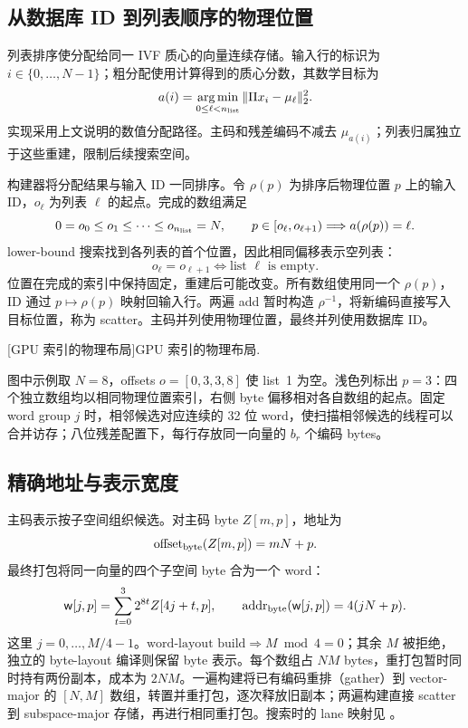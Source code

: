 \subsection{从数据库 ID 到列表顺序的物理位置}

列表排序使分配给同一 IVF 质心的向量连续存储。输入行的标识为 $i\in\{0,\ldots,N-1\}$；粗分配使用计算得到的质心分数，其数学目标为
\begin{equation}
 a(i)=\operatorname*{arg\,min}_{0\leq\ell<n_{\rm list}}
       \|\Pi x_i-\mu_\ell\|_2^2.
 \label{eq:4-assignment}
\end{equation}
实现采用上文说明的数值分配路径。主码和残差编码不减去 $\mu_{a(i)}$；列表归属独立于这些重建，限制后续搜索空间。

构建器将分配结果与输入 ID 一同排序。令 $\rho(p)$ 为排序后物理位置 $p$ 上的输入 ID，$o_\ell$ 为列表 $\ell$ 的起点。完成的数组满足
\begin{equation}
 0=o_0\leq o_1\leq\cdots\leq o_{n_{\rm list}}=N,
 \qquad p\in[o_\ell,o_{\ell+1})\Longrightarrow a(\rho(p))=\ell.
 \label{eq:4-offsets}
\end{equation}
lower-bound 搜索找到各列表的首个位置，因此相同偏移表示空列表：
\[
 o_\ell=o_{\ell+1}\Longleftrightarrow\text{list }\ell\text{ is empty}.
\]
位置在完成的索引中保持固定，重建后可能改变。所有数组使用同一个 $\rho(p)$，ID 通过 $p\mapsto\rho(p)$ 映射回输入行。两遍 add 暂时构造 $\rho^{-1}$，将新编码直接写入目标位置，称为 scatter。主码并列使用物理位置，最终并列使用数据库 ID。

\par\medskip\noindent\begin{minipage}{\linewidth}
\captionsetup{hypcap=false}
\centering

[GPU 索引的物理布局]{GPU 索引的物理布局.}
\label{fig:4-layout}
\end{minipage}\par\medskip

图中示例取 $N=8$，offsets $o=[0,3,3,8]$ 使 list~1 为空。浅色列标出 $p=3$：四个独立数组均以相同物理位置索引，右侧 byte 偏移相对各自数组的起点。固定 word group $j$ 时，相邻候选对应连续的 32 位 word，使扫描相邻候选的线程可以合并访存；八位残差配置下，每行存放同一向量的 $b_r$ 个编码 bytes。

\subsection{精确地址与表示宽度}

主码表示按子空间组织候选。对主码 byte $Z[m,p]$，地址为
\[
 \operatorname{offset}_{\rm byte}(Z[m,p])=mN+p.
\]
最终打包将同一向量的四个子空间 byte 合为一个 word：
\begin{equation}
 \mathsf w[j,p]=\sum_{t=0}^{3}2^{8t}Z[4j+t,p],\qquad
 \operatorname{addr}_{\rm byte}(\mathsf w[j,p])=4(jN+p).
 \label{eq:4-primary-address}
\end{equation}
这里 $j=0,\ldots,M/4-1$。$\text{word-layout build}\Longrightarrow M\bmod4=0$；其余 $M$ 被拒绝，独立的 byte-layout 编译则保留 byte 表示。每个数组占 $NM$ bytes，重打包暂时同时持有两份副本，成本为 $2NM$。一遍构建将已有编码重排（gather）到 vector-major 的 $[N,M]$ 数组，转置并重打包，逐次释放旧副本；两遍构建直接 scatter 到 subspace-major 存储，再进行相同重打包。搜索时的 lane 映射见 。

